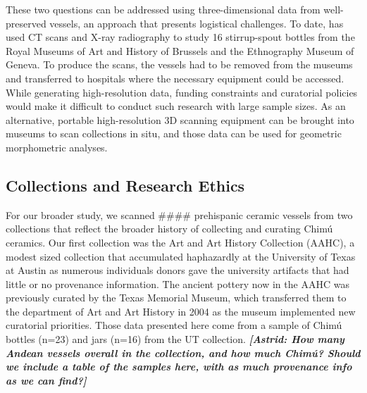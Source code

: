 \documentclass[]{interact}
\theoremstyle{plain}%
\theoremstyle{definition}
\theoremstyle{remark}
\begin{document}
These two questions can be addressed using three-dimensional data from
well-preserved vessels, an approach that presents logistical challenges.
To date, \citet{RN11175} has used CT scans and X-ray radiography to
study 16 stirrup-spout bottles from the Royal Museums of Art and History
of Brussels and the Ethnography Museum of Geneva. To produce the scans,
the vessels had to be removed from the museums and transferred to
hospitals where the necessary equipment could be accessed. While
generating high-resolution data, funding constraints and curatorial
policies would make it difficult to conduct such research with large
sample sizes. As an alternative, portable high-resolution 3D scanning
equipment can be brought into museums to scan collections in situ, and
those data can be used for geometric morphometric analyses.

\hypertarget{collections-and-research-ethics}{%
\subsection{Collections and Research
Ethics}\label{collections-and-research-ethics}}

For our broader study, we scanned \#\#\#\# prehispanic ceramic vessels
from two collections that reflect the broader history of collecting and
curating Chimú ceramics. Our first collection was the Art and Art
History Collection (AAHC), a modest sized collection that accumulated
haphazardly at the University of Texas at Austin as numerous individuals
donors gave the university artifacts that had little or no provenance
information. The ancient pottery now in the AAHC was previously curated
by the Texas Memorial Museum, which transferred them to the department
of Art and Art History in 2004 as the museum implemented new curatorial
priorities. Those data presented here come from a sample of Chimú
bottles (n=23) and jars (n=16) from the UT collection.
\emph{\textbf{{[}Astrid: How many Andean vessels overall in the
collection, and how much Chimú? Should we include a table of the samples
here, with as much provenance info as we can find?{]}}}
\end{document}

